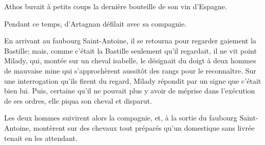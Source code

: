 Athos buvait à petits coups la dernière bouteille de son vin d'Espagne. 

Pendant ce temps, d'Artagnan défilait avec sa compagnie. 

En arrivant au faubourg Saint-Antoine, il se retourna pour regarder gaiement la Bastille; mais, comme c'était la Bastille seulement qu'il regardait, il ne vit point Milady, qui, montée sur un cheval isabelle, le désignait du doigt à deux hommes de mauvaise mine qui s'approchèrent aussitôt des rangs pour le reconnaître. Sur une interrogation qu'ils firent du regard, Milady répondit par un signe que c'était bien lui. Puis, certaine qu'il ne pouvait plus y avoir de méprise dans l'exécution de ses ordres, elle piqua son cheval et disparut. 

Les deux hommes suivirent alors la compagnie, et, à la sortie du faubourg Saint-Antoine, montèrent sur des chevaux tout préparés qu'un domestique sans livrée tenait en les attendant.